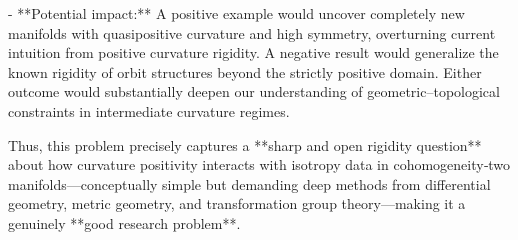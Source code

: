 - **Potential impact:**  
  A positive example would uncover completely new manifolds with quasipositive curvature and high symmetry, overturning current intuition from positive curvature rigidity. A negative result would generalize the known rigidity of orbit structures beyond the strictly positive domain. Either outcome would substantially deepen our understanding of geometric–topological constraints in intermediate curvature regimes.  

Thus, this problem precisely captures a **sharp and open rigidity question** about how curvature positivity interacts with isotropy data in cohomogeneity‑two manifolds—conceptually simple but demanding deep methods from differential geometry, metric geometry, and transformation group theory—making it a genuinely **good research problem**.